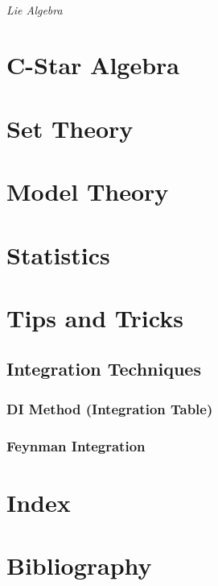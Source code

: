 \documentclass[12pt, english]{book}
\theoremstyle{break}
\theoremstyle{plain}
\begin{document}
	\paragraph{Lie Algebra}
	
	\part{C-Star Algebra}
	
	\part{Set Theory}
	
	\part{Model Theory}
	
	\part{Statistics}
	\part{Tips and Tricks}
	
	\chapter{Integration Techniques}
	
	\section{DI Method (Integration Table)}
	
	\section{Feynman Integration}
	
	\backmatter
	\part{Index}
	
	\part{Bibliography}
	
	\typeout{}
	
	
\end{document}
